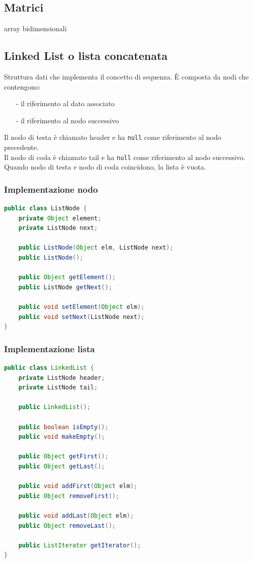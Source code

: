 \documentclass{article}
\begin{document}
\subsection{Matrici}
array bidimensionali

\subsection{Linked List o lista concatenata}
Struttura dati che implementa il concetto di sequenza. È composta da nodi che contengono:
\begin{itemize} [topsep=3pt, itemsep=0pt]
	\item[-] il riferimento al dato associato
	\item[-] il riferimento al nodo successivo
\end{itemize}

Il nodo di testa è chiamato header e ha \verb|null| come riferimento al nodo precedente. \\
Il nodo di coda è chiamato tail e ha \verb|null| come riferimento al nodo successivo. \\
Quando nodo di testa e nodo di coda coincidono, la lista è vuota.

\subsubsection*{Implementazione nodo}
\begin{lstlisting}[language=Java]
public class ListNode {
	private Object element;
	private ListNode next;

	public ListNode(Object elm, ListNode next);
	public ListNode();

	public Object getElement();
	public ListNode getNext();

	public void setElement(Object elm);
	public void setNext(ListNode next);
}
\end{lstlisting}

\subsubsection*{Implementazione lista}
\begin{lstlisting}[language=Java]
public class LinkedList {
	private ListNode header;
	private ListNode tail;

	public LinkedList();

	public boolean isEmpty();
	public void makeEmpty();

	public Object getFirst();
	public Object getLast();

	public void addFirst(Object elm);
	public Object removeFirst();

	public void addLast(Object elm);
	public Object removeLast();

	public ListIterator getIterator();
}
\end{lstlisting}
\end{document}
